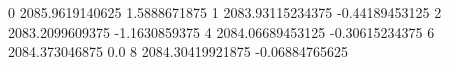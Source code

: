 0 2085.9619140625 1.5888671875
1 2083.93115234375 -0.44189453125
2 2083.2099609375 -1.1630859375
4 2084.06689453125 -0.30615234375
6 2084.373046875 0.0
8 2084.30419921875 -0.06884765625
